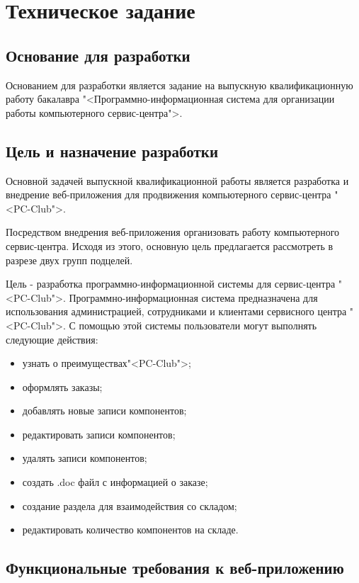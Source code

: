\section{Техническое задание}
\subsection{Основание для разработки}

Основанием для разработки является задание на выпускную квалификационную работу бакалавра "<Программно-информационная система для  организации работы  компьютерного сервис-центра">.

\subsection{Цель и назначение разработки}

Основной задачей выпускной квалификационной работы является разработка и внедрение веб-приложения для продвижения компьютерного сервис-центра "<PC-Club">.

Посредством внедрения веб-приложения организовать работу компьютерного сервис-центра. Исходя из этого, основную цель предлагается рассмотреть в разрезе двух групп подцелей.

Цель - разработка программно-информационной системы для сервис-центра "<PC-Club">.
Программно-информационная система предназначена для использования администрацией,  сотрудниками и  клиентами сервисного центра "<PC-Club">. 
С помощью этой системы пользователи могут выполнять следующие действия:
\begin{itemize}
\item узнать о преимуществах"<PC-Club">;
\item оформлять заказы;
\item добавлять новые записи компонентов;
\item редактировать записи компонентов;
\item удалять записи компонентов;
\item создать .doc файл с информацией о заказе;
\item создание раздела для взаимодействия со складом;
\item редактировать количество компонентов на складе.
\end{itemize}

\subsection{ Функциональные требования к веб-приложению}

